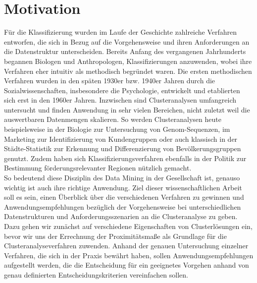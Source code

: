 \chapter{Motivation}

Für die Klassifizierung wurden im Laufe der Geschichte zahlreiche Verfahren entworfen, die sich in Bezug auf die Vorgehensweise und ihren Anforderungen an die Datenstruktur unterscheiden. Bereits Anfang des vergangenen Jahrhunderts begannen Biologen und Anthropologen, Klassifizierungen anzuwenden, wobei ihre Verfahren eher intuitiv als methodisch begründet waren. Die ersten methodischen Verfahren wurden in den späten 1930er bzw. 1940er Jahren durch die Sozialwissenschaften, insbesondere die Psychologie, entwickelt und etablierten sich erst in den 1960er Jahren. Inzwischen sind Clusteranalysen umfangreich untersucht und finden Anwendung in sehr vielen Bereichen, nicht zuletzt weil die auswertbaren Datenmengen skalieren. So werden Clusteranalysen heute beispielsweise in der Biologie zur Untersuchung von Genom-Sequenzen, im Marketing zur Identifizierung von Kundengruppen oder auch klassisch in der Städte-Statistik zur Erkennung und Differenzierung von Bevölkerungsgruppen genutzt. Zudem haben sich Klassifizierungsverfahren ebenfalls in der Politik zur Bestimmung förderungsrelevanter Regionen nützlich gemacht. \\

So bedeutend diese Disziplin des Data Mining in der Gesellschaft ist, genauso wichtig ist auch ihre richtige Anwendung. Ziel dieser wissenschaftlichen Arbeit soll es sein, einen Überblick über die verschiedenen Verfahren zu gewinnen und Anwendungsempfehlungen bezüglich der Vorgehensweise bei unterschiedlichen Datenstrukturen und Anforderungsszenarien an die Clusteranalyse zu geben. \\

Dazu gehen wir zunächst auf verschiedene Eigenschaften von Clusterlösungen ein, bevor wir uns der Errechnung der Proximitätsmaße als Grundlage für die Clusteranalyseverfahren zuwenden.
Anhand der genauen Untersuchung einzelner Verfahren, die sich in der Praxis bewährt haben, sollen Anwendungsempfehlungen aufgestellt werden, die die Entscheidung für ein geeignetes Vorgehen anhand von genau definierten Entscheidungskriterien vereinfachen sollen.